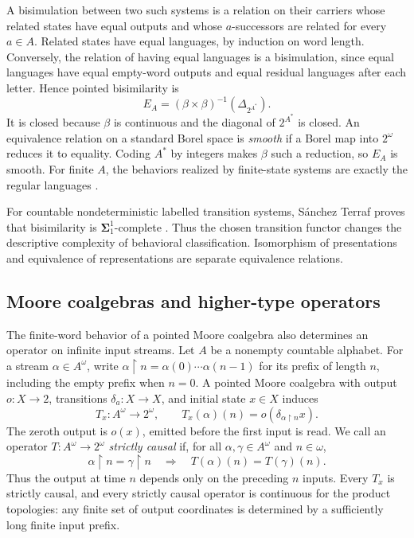\documentclass[11pt]{article}
\theoremstyle{definition}
\begin{document}
A bisimulation between two such systems is a relation on their
carriers whose related states have equal outputs and whose
$a$-successors are related for every $a\in A$. Related states
have equal languages, by induction on word length. Conversely,
the relation of having equal languages is a bisimulation, since
equal languages have equal empty-word outputs and equal residual
languages after each letter. Hence pointed bisimilarity is
\[
 E_A=(\beta\times\beta)^{-1}(\Delta_{2^{A^*}}).
\]
It is closed because $\beta$ is continuous and the diagonal of
$2^{A^*}$ is closed. An equivalence relation on a standard Borel
space is \emph{smooth} if a Borel map into $2^\omega$ reduces it
to equality. Coding $A^*$ by integers makes $\beta$ such a
reduction, so $E_A$ is smooth. For finite $A$, the behaviors
realized by finite-state systems are exactly the regular languages
\cite{RuttenAutomata}.

For countable nondeterministic labelled transition systems,
S\'anchez Terraf proves that bisimilarity is
$\boldsymbol\Sigma^1_1$-complete \cite{Terraf}. Thus the chosen
transition functor changes the descriptive complexity of behavioral
classification. Isomorphism of presentations and equivalence of
representations are separate equivalence relations.

\subsection{Moore coalgebras and higher-type operators}\label{sec:higher-type}

The finite-word behavior of a pointed Moore coalgebra also determines
an operator on infinite input streams. Let $A$ be a nonempty countable
alphabet. For a stream $\alpha\in A^\omega$, write
$\alpha\upharpoonright n=\alpha(0)\cdots\alpha(n-1)$ for its
prefix of length $n$, including the empty prefix when $n=0$.
A pointed Moore coalgebra with output $o:X\to2$, transitions
$\delta_a:X\to X$, and initial state $x\in X$ induces
\begin{equation}\label{eq:moore-stream}
 T_x:A^\omega\longrightarrow2^\omega,
 \qquad T_x(\alpha)(n)=o(\delta_{\alpha\upharpoonright n}x).
\end{equation}
The zeroth output is $o(x)$, emitted before the first input is read.
We call an operator $T:A^\omega\to2^\omega$ \emph{strictly causal}
if, for all $\alpha,\gamma\in A^\omega$ and $n\in\omega$,
\begin{equation}\label{eq:strict-causality}
 \alpha\upharpoonright n=\gamma\upharpoonright n
 \quad\Longrightarrow\quad T(\alpha)(n)=T(\gamma)(n).
\end{equation}
Thus the output at time $n$ depends only on the preceding $n$ inputs.
Every $T_x$ is strictly causal, and every strictly causal operator is
continuous for the product topologies: any finite set of output
coordinates is determined by a sufficiently long finite input prefix.
\end{document}

